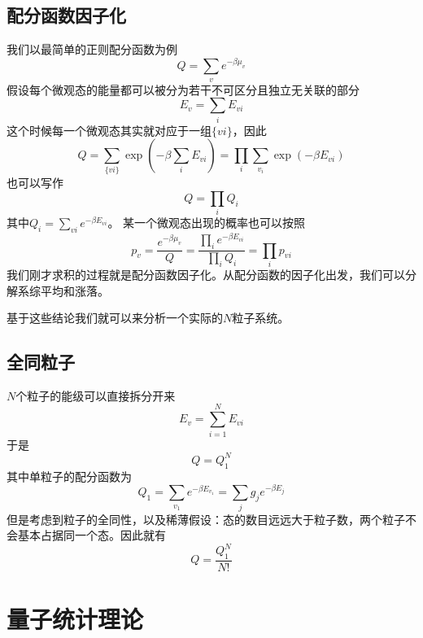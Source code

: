\subsection{配分函数因子化} %
\label{sub:配分函数因子化}
我们以最简单的正则配分函数为例\begin{equation}
    Q=\sum_v e^{-\beta \mu_v}
\end{equation}
假设每个微观态的能量都可以被分为若干不可区分且独立无关联的部分\begin{equation}
    E_v =\sum_i E_{vi}
\end{equation}
这个时候每一个微观态其实就对应于一组$\{vi\}$，因此\begin{equation}
    Q=\sum_{\{vi\}} \exp{(-\beta \sum_i E_{vi})}=\prod_i \sum_{v_i} \exp{(-\beta E_{vi})}
\end{equation}
也可以写作\begin{equation}
    Q=\prod_i Q_i
\end{equation}
其中$\displaystyle Q_i=\sum_{vi}e^{-\beta E_{vi}}$。
某一个微观态出现的概率也可以按照\begin{equation}
    p_v=\frac{e^{-\beta \mu_v}}{Q}= \frac{\prod_i e^{-\beta E_{vi}}}{\prod_i Q_i}=\prod_i p_{vi}
\end{equation}
我们刚才求积的过程就是配分函数因子化。从配分函数的因子化出发，我们可以分解系综平均和涨落。

基于这些结论我们就可以来分析一个实际的$N$粒子系统。

\subsection{全同粒子} %
\label{sub:全同粒子}
$N$个粒子的能级可以直接拆分开来\begin{equation}
    E_v=\sum_{i=1}^N E_{vi}
\end{equation}
于是\begin{equation}
    Q=Q_1^N
\end{equation}
其中单粒子的配分函数为\begin{equation}
    Q_1=\sum_{v_1} e^{-\beta E_{v_1}}=\sum_j g_j e^{-\beta E_j}
\end{equation}
但是考虑到粒子的全同性，以及稀薄假设：态的数目远远大于粒子数，两个粒子不会基本占据同一个态。因此就有\begin{equation}
    Q=\frac{Q_1^N}{N!}
\end{equation}
\section{量子统计理论} %
\label{sec:量子统计理论}
